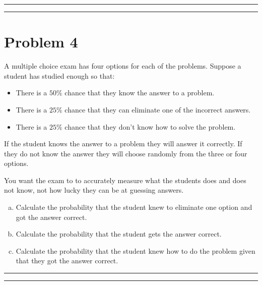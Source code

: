\documentclass{article}
\theoremstyle{definition}
\newenvironment{solution}{\bigskip\hrule{\hfill}}{\bigskip\hrule{\hfill}} %
\begin{document}
\begin{solution}


\end{solution}


\newpage


\section*{Problem 4}

A multiple choice exam has four options for each of the problems. Suppose a student has studied enough so that:
\begin{itemize}
    \item There is a $50\%$ chance that they know the answer to a problem.
    \item There is a $25\%$ chance that they can eliminate one of the incorrect answers.
    \item There is a $25\%$ chance that they don't know how to solve the problem.
\end{itemize}
If the student knows the answer to a problem they will answer it correctly. If they do not know the answer they will choose randomly from the three or four options. \medskip

You want the exam to to accurately measure what the students does and does not know, not how lucky they can be at guessing answers.

\begin{enumerate}[a)] %
    \item Calculate the probability that the student knew to eliminate one option and got the answer correct.
    \item Calculate the probability that the student gets the answer correct.
    \item Calculate the probability that the student knew how to do the problem given that they got the answer correct.
\end{enumerate}
\begin{solution}


\end{solution}
\end{document}
